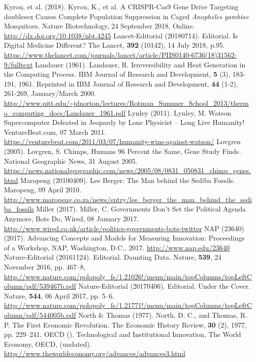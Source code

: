 \begin{multicols}{2}
\begin{thebibliography}{99}
 Kyrou, et al. (2018). Kyrou, K., et al. A CRISPR-Cas9 Gene Drive Targeting doublesex Causes Complete Population Suppression in Caged \textit{Anopheles gambiae} Mosquitoes. Nature Biotechnology, 24 September 2018, Online. \url{http://dx.doi.org/10.1038/nbt.4245}
 Lancet-Editorial (20180714). Editorial. Is Digital Medicine Different? The Lancet, \textbf{392} (10142), 14 July 2018, p.95. \url{https://www.thelancet.com/journals/lancet/article/PIIS0140-6736(18)31562-9/fulltext}
 Landauer (1961). Landauer, R. Irreversibility and Heat Generation in the Computing Process. IBM Journal of Research and Development, \textbf{5} (3), 183-191, 1961. Reprinted in IBM Journal of Research and Development, \textbf{44} (1-2), 261-269, January/March 2000. \url{http://www.pitt.edu/~jdnorton/lectures/Rotman_Summer_School_2013/thermo_computing_docs/Landauer_1961.pdf}
 Lynley (2011). Lynley, M. Watson Supercomputer Defeated in Jeopardy by Lone Physicist -- Long Live Humanity! VentureBeat.com, 07 March 2011. \url{https://venturebeat.com/2011/03/07/humanity-wins-against-watson/}
 Lovgren (2005). Lovgren, S. Chimps, Humans 96 Percent the Same, Gene Study Finds. National Geographic News, 31 August 2005. \url{https://news.nationalgeographic.com/news/2005/08/0831_050831_chimp_genes.html}
 Maropeng (20100409). Lee Berger: The Man behind the Sediba Fossils. Maropeng, 09 April 2010. \url{http://www.maropeng.co.za/news/entry/lee_berger_the_man_behind_the_sediba_fossils}
 Miller (2017). Miller, C. Governments Don't Set the Political Agenda Anymore, Bots Do, Wired, 08 January 2017. \url{http://www.wired.co.uk/article/politics-governments-bots-twitter}
 NAP (23640) (2017). Advancing Concepts and Models for Measuring Innovation: Proceedings of a Workshop, NAP, Washington, D.C., 2017. \url{http://www.nap.edu/23640}
 Nature-Editorial (20161124). Editorial. Daunting Data. Nature, \textbf{539}, 24 November 2016, pp. 467--8, \url{http://www.nature.com/polopoly_fs/1.21026!/menu/main/topColumns/topLeftColumn/pdf/539467b.pdf}
 Nature-Editorial (20170406). Editorial. Under the Cover. Nature, \textbf{544}, 06 April 2017, pp. 5--6. \url{http://www.nature.com/polopoly_fs/1.21771!/menu/main/topColumns/topLeftColumn/pdf/544005b.pdf}
 North \& Thomas (1977). North, D. C., and Thomas, R. P. The First Economic Revolution. The Economic History Review, \textbf{30} (2), 1977, pp. 229--241.
 OECD (). Technological and Institutional Innovation, The World Economy, OECD, (undated). \url{http://www.theworldeconomy.org/advances/advances3.html}

\end{thebibliography}
\end{multicols}

